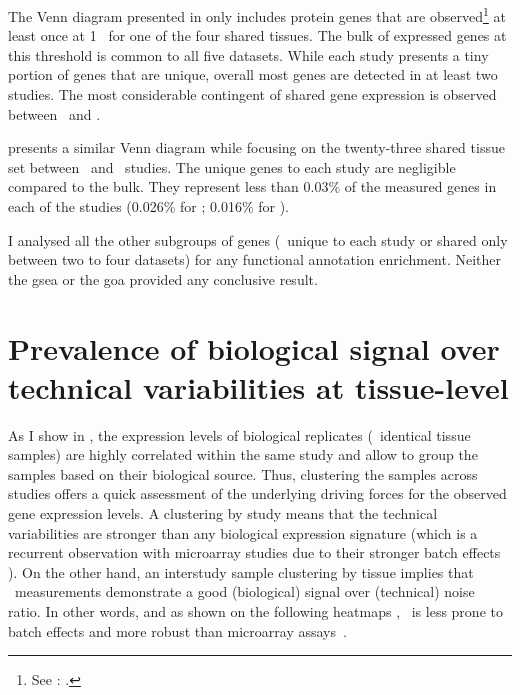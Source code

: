 The Venn diagram presented in  only includes protein
genes that are observed\footnote{See
: .}
at least once at 1 \FPKM\ for one of the four shared tissues.
The bulk of expressed genes at this threshold is common
to all five datasets.
While each study presents a tiny portion of genes
that are unique,
overall most genes are detected in at least two studies.
The most considerable contingent of shared gene expression is observed
between \uhlen\ and \gtex.

 presents a similar Venn diagram
while focusing on the twenty-three shared tissue set
between \uhlen\ and \gtex\ studies.
The unique genes to each study are negligible compared to the bulk.
They represent less than 0.03\% of the measured genes in each of the studies
(0.026\% for \uhlen; 0.016\% for \gtex).
\begin{comment}
    Gtex:   462/17551 hence 0.02632329\%
    Uhlen:  281/17551 hence 0.01601048\%
\end{comment}

I analysed all the other subgroups of genes
(\ie\ unique to each study or shared only between two to four datasets)
for any functional annotation enrichment.
Neither the \gls{gsea} or the \gls{goa} provided any conclusive result.

\section{Prevalence of biological signal over technical variabilities at
tissue-level}
\label{sec:Trans_ReproExpresTissue}

As I show in ,
the expression levels of biological replicates (\ie\ identical tissue samples)
are highly correlated within the same study
and allow to group the samples based on their biological source.
Thus, clustering the samples across studies offers a quick assessment of
the underlying driving forces for the observed gene expression levels.
A clustering by study means that the technical variabilities are stronger
than any biological expression signature
(which is a recurrent observation with microarray studies
due to their stronger batch effects ).
On the other hand,
an interstudy sample clustering by tissue implies that \Rnaseq\ measurements
demonstrate a good (biological) signal over (technical) noise ratio.
In other words,
and as shown on the following heatmaps ,
\Rnaseq\ is less prone to batch effects and more robust than
microarray assays~.

